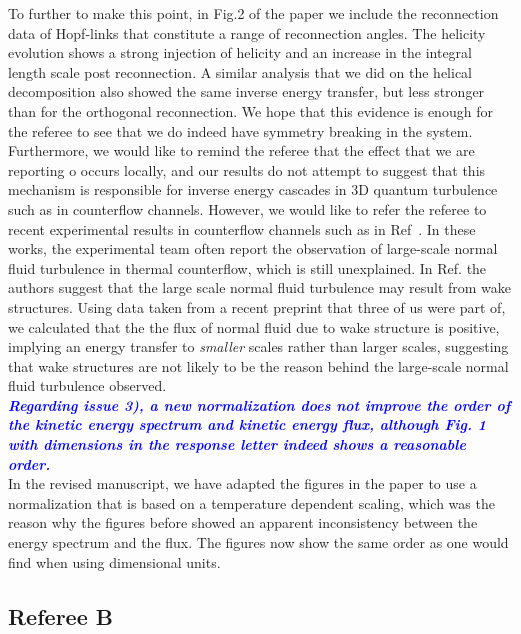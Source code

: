 \documentclass[a4paper,10pt]{article}
\def\blue#1{\textcolor{blue}{#1}}
\def\refcomment#1{\textbf{\blue{\emph{#1}}}\\}
\begin{document}
To further to make this point, in Fig.2 of the paper we include the reconnection data of Hopf-links that constitute a range of reconnection angles. The helicity evolution shows a strong injection of helicity and an increase in the integral length scale post reconnection. A similar analysis that we did on the helical decomposition also showed the same inverse energy transfer, but less stronger than for the orthogonal reconnection. We hope that this evidence is enough for the referee to see that we do indeed have symmetry breaking in the system. \\

Furthermore, we would like to remind the referee that the effect that we are reporting o occurs locally, and our results do not attempt to suggest that this mechanism is responsible for inverse energy cascades in 3D quantum turbulence such as in counterflow channels. However, we would like to refer the referee to recent experimental results in counterflow channels such as in Ref~\cite{marakov2015,gao2017,mastracci2019,yui2020}. In these works, the experimental team often report the observation of large-scale normal fluid turbulence in thermal counterflow, which is still unexplained. In Ref.\cite{mastracci2019} the authors suggest that the large scale normal fluid turbulence may result from wake structures. Using data taken from a recent preprint \cite{galantucci2025} that three of us were part of, we calculated that the the flux of normal fluid due to wake structure is positive, implying an energy transfer to \emph{smaller} scales rather than larger scales, suggesting that wake structures are not likely to be the reason behind the large-scale normal fluid turbulence observed. \\

\refcomment{Regarding issue 3), a new normalization does not improve
the order of the kinetic energy spectrum and kinetic energy flux,
although Fig. 1 with dimensions in the response letter indeed shows a
reasonable order.}

In the revised manuscript, we have adapted the figures in the paper to use a normalization that is based on a temperature dependent scaling, which was the reason why the figures before showed an apparent inconsistency between the energy spectrum and the flux. The figures now show the same order as one would find when using dimensional units. 

\subsection*{Referee B}
\end{document}
